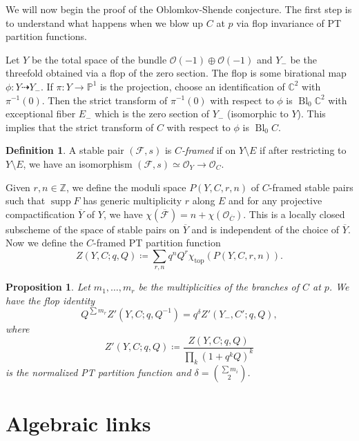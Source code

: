 \documentclass{amsart}
\newtheorem{prop}[thm]{Proposition}
\theoremstyle{definition}
\newtheorem{defn}[thm]{Definition}
\theoremstyle{remark}
\theoremstyle{plain}
\theoremstyle{definition}
\theoremstyle{remark}
\newcommand{\C}{\mathbb{C}}
\newcommand{\Z}{\mathbb{Z}}
\renewcommand{\P}{\mathbb{P}}
\newcommand{\mc}[1]{\mathcal{#1}}
\newcommand{\mr}[1]{\mathrm{#1}}
\newcommand{\ol}[1]{\overline{#1}}
\newcommand{\1}{\mathbf{1}}
\newcommand{\2}{\mathbf{2}}
\newcommand{\3}{\mathbf{3}}
\DeclareMathOperator{\supp}{supp}
\DeclareMathOperator{\Bl}{Bl}
\begin{document}
We will now begin the proof of the Oblomkov-Shende conjecture. The first step is to understand what happens when we blow up $C$ at $p$ via flop invariance of PT partition functions.

Let $Y$ be the total space of the bundle $\mc{O}(-1) \oplus \mc{O}(-1)$ and $Y_-$ be the threefold obtained via a flop of the zero section. The flop is some birational map $\phi \colon Y \dashrightarrow Y_-$. If $\pi \colon Y \to \P^1$ is the projection, choose an identification of $\C^2$ with $\pi^{-1}(0)$. Then the strict transform of $\pi^{-1}(0)$ with respect to $\phi$ is $\Bl_{0} \C^2$ with exceptional fiber $E_-$ which is the zero section of $Y_-$ (isomorphic to $Y$). This implies that the strict transform of $C$ with respect to $\phi$ is $\Bl_0 C$.

\begin{defn}
    A stable pair $(\mc{F}, s)$ is \textit{$C$-framed} if on $Y \setminus E$ if after restricting to $Y \setminus E$, we have an isomorphism $(\mc{F}, s) \simeq \mc{O}_Y \to \mc{O}_C$.
\end{defn}

Given $r, n \in \Z$, we define the moduli space $P(Y, C, r, n)$ of $C$-framed stable pairs such that $\supp F$ has generic multiplicity $r$ along $E$ and for any projective compactification $\ol{Y}$ of $Y$, we have $\chi(\ol{\mc{F}}) = n + \chi(\mc{O}_{\ol{C}})$. This is a locally closed subscheme of the space of stable pairs on $\ol{Y}$ and is independent of the choice of $\ol{Y}$. Now we define the $C$-framed PT partition function
\[ Z(Y, C; q, Q) \coloneqq \sum_{r,n} q^n Q^r \chi_{\mr{top}}(P(Y,C,r,n)). \]

\begin{prop}
    Let $m_1, \ldots, m_r$ be the multiplicities of the branches of $C$ at $p$. We have the flop identity
    \[Q^{\sum m_r} Z'(Y, C; q, Q^{-1}) = q^{\delta} Z'(Y_-, C'; q,Q), \]
    where 
    \[ Z'(Y,C; q,Q) \coloneqq \frac{Z(Y,C; q,Q)}{\prod_k {(1+q^k Q)}^k} \]
    is the normalized PT partition function and $\delta = \binom{\sum m_i}{2}$.
\end{prop}

\section{Algebraic links}%
\label{sec:algebraic_links}
\end{document}
